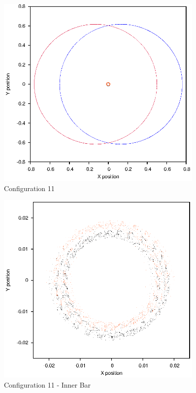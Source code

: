 \documentclass[a4paper,12pt]{article}
\begin{document}
\begin{figure}[H]
\centering
\includegraphics[width=0.9\textwidth]{./2016results/025-65-02/Orbit.eps}
\caption{Configuration 11}
\label{fig:config11}
\end{figure}
\begin{figure}[H]
\centering
\includegraphics[width=0.9\textwidth]{./2016results/025-65-02/Inner.eps}
\caption{Configuration 11 - Inner Bar}
\label{fig:config11i}
\end{figure}
\end{document}
